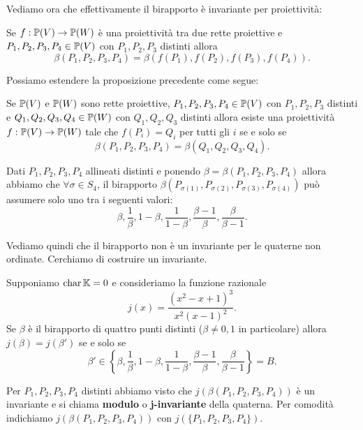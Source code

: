 \begin{multicols*}{2}
    Vediamo ora che effettivamente il birapporto \`e invariante per proiettivit\`a:
    \begin{proposition}
    Se $f:{\mathbb{P}(V)}\to{\mathbb{P}(W)}$ \`e una proiettivit\`a tra due rette proiettive e $P_1,P_2,P_3,P_4\in {\mathbb{P}(V)}$ con $P_1,P_2,P_3$ distinti allora
    \[\beta(P_1,P_2,P_3,P_4)=\beta(f(P_1),f(P_2),f(P_3),f(P_4)).\]
    \end{proposition}

    Possiamo estendere la proposizione precedente come segue:
    \begin{proposition}\label{CriterioEsistenzaProiettivitaConBirapporto}
    Se ${\mathbb{P}(V)}$ e ${\mathbb{P}(W)}$ sono rette proiettive, $P_1,P_2,P_3,P_4\in {\mathbb{P}(V)}$ con $P_1,P_2,P_3$ distinti e $Q_1,Q_2,Q_3,Q_4\in {\mathbb{P}(W)}$ con $Q_1,Q_2,Q_3$ distinti allora esiste una proiettivit\`a $f:{\mathbb{P}(V)}\to{\mathbb{P}(W)}$ tale che $f(P_i)=Q_i$ per tutti gli $i$ se e solo se
    \[\beta(P_1,P_2,P_3,P_4)=\beta(Q_1,Q_2,Q_3,Q_4).\]
    \end{proposition}

    \begin{proposition}
    Dati $P_1,P_2,P_3,P_4$ allineati distinti e ponendo $\beta=\beta(P_1,P_2,P_3,P_4)$ allora abbiamo che $\forall \sigma\in S_4$, il birapporto $\beta(P_{\sigma(1)},P_{\sigma(2)},P_{\sigma(3)},P_{\sigma(4)})$ pu\`o assumere solo uno tra i seguenti valori:
    \[\beta,\frac1\beta,1-\beta,\frac1{1-\beta},\frac{\beta-1}\beta,\frac\beta{\beta-1}.\]
    \end{proposition}

    Vediamo quindi che il birapporto non \`e un invariante per le quaterne non ordinate. Cerchiamo di costruire un invariante.

    \begin{proposition}
    Supponiamo $\mathrm{char}\,\mathbb{K}=0$ e consideriamo la funzione razionale
    \[j(x)=\frac{(x^2-x+1)^3}{x^2(x-1)^2}.\]
    Se $\beta$ \`e il birapporto di quattro punti distinti ($\beta\neq0,1$ in particolare) allora $j(\beta)=j(\beta')$ se e solo se
    \[\beta'\in\left\{\beta,\frac1\beta,1-\beta,\frac1{1-\beta},\frac{\beta-1}\beta,\frac\beta{\beta-1}\right\}=B.\]
    \end{proposition}

    \begin{definition}
    Per $P_1,P_2,P_3,P_4$ distinti abbiamo visto che $j(\beta(P_1,P_2,P_3,P_4))$ \`e un invariante e si chiama \textbf{modulo} o \textbf{j-invariante} della quaterna. Per comodit\`a indichiamo
    $j(\beta(P_1,P_2,P_3,P_4))$ con $j(\{P_1,P_2,P_3,P_4\})$.
    \end{definition}


\end{multicols*}
